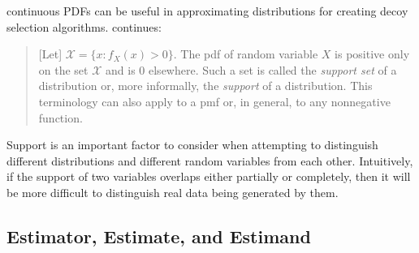 \documentclass[english]{article}
\begin{document}
continuous PDFs can be useful in approximating distributions for creating
decoy selection algorithms. \cite{CasellaBerger2002} continues:
\begin{quote}
{[}Let{]} $\mathcal{X}=\{x:f_{X}(x)>0\}$. The pdf of random variable
$X$ is positive only on the set $\mathcal{X}$ and is 0 elsewhere.
Such a set is called the \textit{support set} of a distribution or,
more informally, the \textit{support} of a distribution. This terminology
can also apply to a pmf or, in general, to any nonnegative function.
\end{quote}
Support is an important factor to consider when attempting to distinguish
different distributions and different random variables from each other.
Intuitively, if the support of two variables overlaps either partially
or completely, then it will be more difficult to distinguish real
data being generated by them.

\subsection{Estimator, Estimate, and Estimand}
\end{document}
